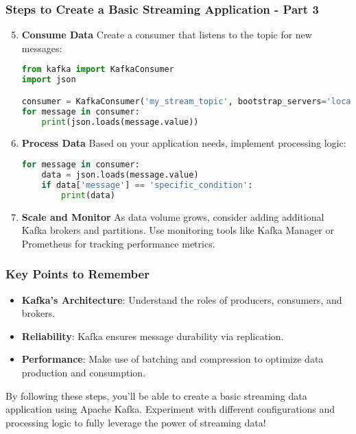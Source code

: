 \documentclass[aspectratio=169]{beamer}
\begin{document}
\begin{frame}[fragile]
    \frametitle{Steps to Create a Basic Streaming Application - Part 3}
    \begin{enumerate}
        \setcounter{enumi}{4}
        \item \textbf{Consume Data}
        Create a consumer that listens to the topic for new messages:
        \begin{lstlisting}[language=python]
from kafka import KafkaConsumer
import json

consumer = KafkaConsumer('my_stream_topic', bootstrap_servers='localhost:9092', auto_offset_reset='earliest', enable_auto_commit=True)
for message in consumer:
    print(json.loads(message.value))
        \end{lstlisting}

        \item \textbf{Process Data}
        Based on your application needs, implement processing logic:
        \begin{lstlisting}[language=python]
for message in consumer:
    data = json.loads(message.value)
    if data['message'] == 'specific_condition':
        print(data)
        \end{lstlisting}
        
        \item \textbf{Scale and Monitor}
        As data volume grows, consider adding additional Kafka brokers and partitions. Use monitoring tools like Kafka Manager or Prometheus for tracking performance metrics.
    \end{enumerate}
\end{frame}

\begin{frame}
    \frametitle{Key Points to Remember}
    \begin{itemize}
        \item \textbf{Kafka's Architecture}: Understand the roles of producers, consumers, and brokers.
        \item \textbf{Reliability}: Kafka ensures message durability via replication.
        \item \textbf{Performance}: Make use of batching and compression to optimize data production and consumption.
    \end{itemize}
    By following these steps, you’ll be able to create a basic streaming data application using Apache Kafka. Experiment with different configurations and processing logic to fully leverage the power of streaming data!
\end{frame}
\end{document}
